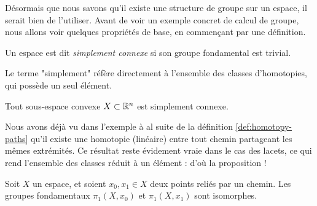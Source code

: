 Désormais que nous savons qu'il existe une structure de groupe sur un espace, il serait bien de l'utiliser. Avant de voir un exemple concret de calcul de groupe, nous allons voir quelques propriétés de base, en commençant par une définition.

\begin{definition}
Un espace est dit \emph{simplement connexe} si son groupe fondamental est trivial.
\end{definition}

Le terme "simplement" réfère directement à l'ensemble des classes d'homotopies, qui possède un seul élément.

\begin{proposition}
Tout sous-espace convexe $X\subset\mathbb{R}^n$ est simplement connexe.
\end{proposition}

Nous avons déjà vu dans l'exemple à al suite de la définition \ref{def:homotopy-paths} qu'il existe une homotopie (linéaire) entre tout chemin partageant les mêmes extrémités. Ce résultat reste évidement vraie dans le cas des lacets, ce qui rend l'ensemble des classes réduit à un élément : d'où la proposition !

\begin{proposition}
Soit $X$ un espace, et soient $x_0,x_1\in X$ deux points reliés par un chemin. Les groupes fondamentaux $\pi_1(X,x_0)$ et $\pi_1(X,x_1)$ sont isomorphes.
\end{proposition}



